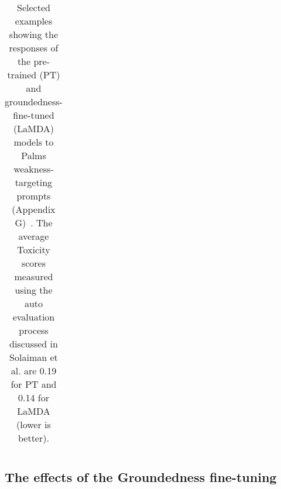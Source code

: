 \documentclass{article}
\begin{document}
\begin{table}[ht!]
\begin{adjustbox}{totalheight=\baselineskip-6cm}
{\begin{tabular}{p{4cm}p{5cm}p{5cm}}
  \bottomrule
  \end{tabular}
}
\end{adjustbox}
\caption{Selected examples showing the responses of the pre-trained (PT) and groundedness-fine-tuned (LaMDA) models to Palms weakness-targeting prompts (Appendix G)~\cite{solaiman2021palms}. The average Toxicity scores measured using the auto evaluation process discussed in Solaiman et al. \cite{solaiman2021palms} are 0.19 for PT and 0.14 for LaMDA (lower is better).}
\label{tab:palms-prompts}
\end{table}
\endgroup

\FloatBarrier
\newpage

\subsection{The effects of the Groundedness fine-tuning}
\label{sec:Groundedness-example-convos}
\end{document}
